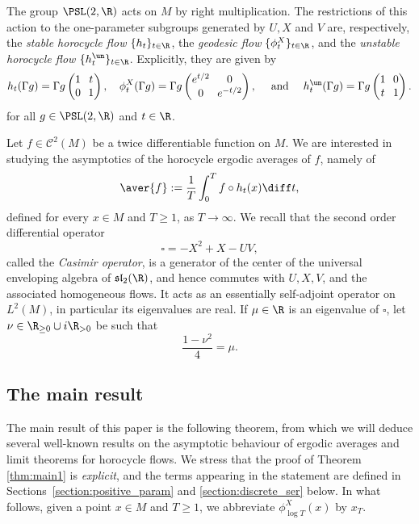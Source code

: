 The group $\PSL(2,\R)$ acts on $M$ by right multiplication.
The restrictions of this action to the one-parameter subgroups generated by $U, X$ and $V$ are, respectively, the \emph{stable horocycle flow} $\{h_t\}_{t \in \R}$, the \emph{geodesic flow} $\{\phi^X_t\}_{t \in \R}$, and the \emph{unstable horocycle flow} $\{h^{\un}_t\}_{t \in \R}$.
Explicitly, they are given by\enlargethispage{.5\baselineskip}
\[\arraycolsep3.5pt
h_t(\Gamma g) = \Gamma g
\begin{pmatrix}
1 & t \\
0 & 1
\end{pmatrix},
\quad
\phi^X_t(\Gamma g) = \Gamma g
\begin{pmatrix}
e^{t/2} & 0 \\
0 & e^{-t/2}
\end{pmatrix},
\quad \text{ and } \quad
h^{\un}_t(\Gamma g) = \Gamma g
\begin{pmatrix}
1 & 0 \\
t & 1
\end{pmatrix}.
\]
for all $g \in \PSL(2,\R)$ and $t \in \R$.

Let $f \in \mathscr{C}^2(M)$ be a twice differentiable function on $M$.
We are interested in studying the asymptotics of the horocycle ergodic averages of $f$, namely of\vspace*{-3pt}
\[
\aver{f} := \frac{1}{T} \int_0^T f \circ h_t (x) \diff t,
\]
defined for every $x \in M$ and $T \geq 1$, as $T \to \infty$.
We recall that the second order differential operator\vspace*{-3pt}
\[
\square = -X^2+X-UV,
\]
called the \emph{Casimir operator}, is a generator of the center of the universal enveloping algebra of $\mathfrak{sl}_2(\R)$, and hence commutes with $U, X, V$, and the associated homogeneous flows.
It acts as an essentially self-adjoint operator on $L^2(M)$, in particular its eigenvalues are real.
If $\mu \in\R$ is an eigenvalue of $\square$, let $\nu \in \R_{\geq 0 } \cup i \R_{>0}$ be such that\vspace*{-3pt}
\[
\frac{1-\nu^2}{4} = \mu.
\]

\subsection{The main result}

The main result of this paper is the following theorem, from which we will deduce several well-known results on the asymptotic behaviour of ergodic averages and limit theorems for horocycle flows.
We stress that the proof of Theorem \ref{thm:main1} is \emph{explicit}, and the terms appearing in the statement are defined in Sections~\ref{section:positive_param} and \ref{section:discrete_ser} below.
In what follows, given a point $x\in M$ and $T\geq 1$, we abbreviate $\phi^X_{\log T}(x)$ by $x_T$.

